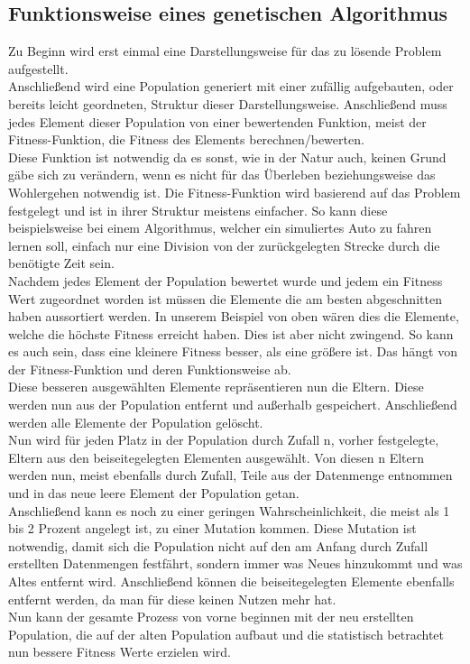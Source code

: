 \documentclass[a4paper,12pt]{article}
\begin{document}
\subsection{Funktionsweise eines genetischen Algorithmus}
Zu Beginn wird erst einmal eine Darstellungsweise für das zu lösende Problem aufgestellt. \\
Anschließend wird eine Population generiert mit einer zufällig aufgebauten, oder bereits leicht geordneten, Struktur dieser Darstellungsweise. Anschließend muss jedes Element dieser Population von einer bewertenden Funktion, meist der Fitness-Funktion, die Fitness des Elements berechnen/bewerten. \\
Diese Funktion ist notwendig da es sonst, wie in der Natur auch, keinen Grund gäbe sich zu verändern, wenn es nicht für das Überleben beziehungsweise das Wohlergehen notwendig ist. Die Fitness-Funktion wird basierend auf das Problem festgelegt und ist in ihrer Struktur meistens einfacher. So kann diese beispielsweise bei einem Algorithmus, welcher ein simuliertes Auto zu fahren lernen soll, einfach nur eine Division von der zurückgelegten Strecke durch die benötigte Zeit sein. \\
Nachdem jedes Element der Population bewertet wurde und jedem ein Fitness Wert zugeordnet worden ist müssen die Elemente die am besten abgeschnitten haben aussortiert werden. In unserem Beispiel von oben wären dies die Elemente, welche die höchste Fitness erreicht haben. Dies ist aber nicht zwingend. So kann es auch sein, dass eine kleinere Fitness besser, als eine größere ist. Das hängt von der Fitness-Funktion und deren Funktionsweise ab. \\
Diese besseren ausgewählten Elemente repräsentieren nun die Eltern. Diese werden nun aus der Population entfernt und außerhalb gespeichert. Anschließend werden alle Elemente der Population gelöscht. \\
Nun wird für jeden Platz in der Population durch Zufall n, vorher festgelegte, Eltern aus den beiseitegelegten Elementen ausgewählt. Von diesen n Eltern werden nun, meist ebenfalls durch Zufall, Teile aus der Datenmenge entnommen und in das neue leere Element der Population getan. \\
Anschließend kann es noch zu einer geringen Wahrscheinlichkeit, die meist als 1 bis 2 Prozent angelegt ist, zu einer Mutation kommen. Diese Mutation ist notwendig, damit sich die Population nicht auf den am Anfang durch Zufall erstellten Datenmengen festfährt, sondern immer was Neues hinzukommt und was Altes entfernt wird. Anschließend können die beiseitegelegten Elemente ebenfalls entfernt werden, da man für diese keinen Nutzen mehr hat. \\
Nun kann der gesamte Prozess von vorne beginnen mit der neu erstellten Population, die auf der alten Population aufbaut und die statistisch betrachtet nun bessere Fitness Werte erzielen wird. 
\end{document}
